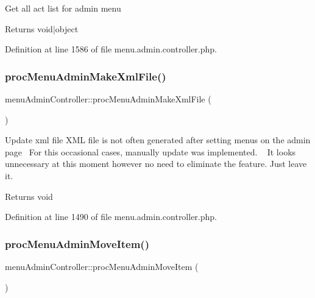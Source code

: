 Get all act list for admin menu \begin{DoxyReturn}{Returns}
void$\vert$object 
\end{DoxyReturn}


Definition at line 1586 of file menu.\+admin.\+controller.\+php.

\hypertarget{classmenuAdminController_a8808afabf9eee859aca4150fc5d23051}{}\label{classmenuAdminController_a8808afabf9eee859aca4150fc5d23051} 
\subsubsection{\texorpdfstring{proc\+Menu\+Admin\+Make\+Xml\+File()}{procMenuAdminMakeXmlFile()}}
{\footnotesize\ttfamily menu\+Admin\+Controller\+::proc\+Menu\+Admin\+Make\+Xml\+File (\begin{DoxyParamCaption}{ }\end{DoxyParamCaption})}

Update xml file X\+ML file is not often generated after setting menus on the admin page~\newline
For this occasional cases, manually update was implemented. ~\newline
It looks unnecessary at this moment however no need to eliminate the feature. Just leave it. \begin{DoxyReturn}{Returns}
void 
\end{DoxyReturn}


Definition at line 1490 of file menu.\+admin.\+controller.\+php.

\hypertarget{classmenuAdminController_a4b1060e3cfddcffae2881a2981660b8b}{}\label{classmenuAdminController_a4b1060e3cfddcffae2881a2981660b8b} 
\subsubsection{\texorpdfstring{proc\+Menu\+Admin\+Move\+Item()}{procMenuAdminMoveItem()}}
{\footnotesize\ttfamily menu\+Admin\+Controller\+::proc\+Menu\+Admin\+Move\+Item (\begin{DoxyParamCaption}{ }\end{DoxyParamCaption})}

